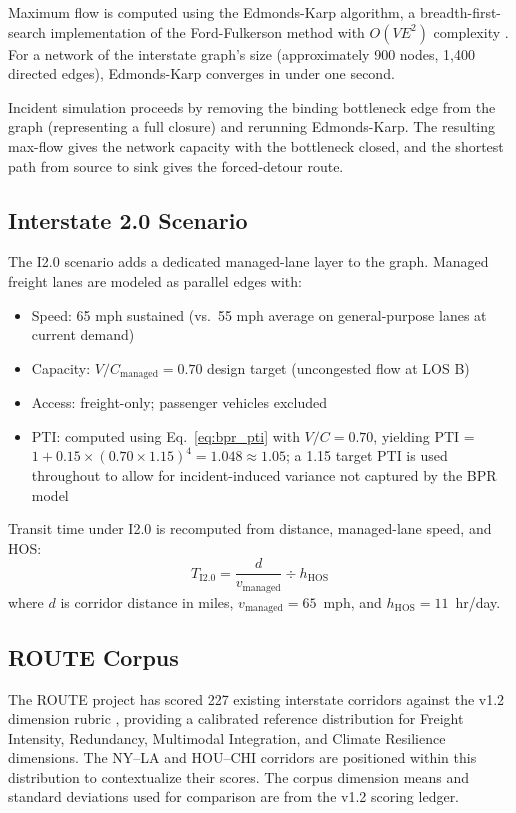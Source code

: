 Maximum flow is computed using the Edmonds-Karp algorithm, a breadth-first-search implementation of the Ford-Fulkerson method with $O(VE^2)$ complexity \citep{ROUTE_A1}. For a network of the interstate graph's size (approximately 900 nodes, 1,400 directed edges), Edmonds-Karp converges in under one second.

Incident simulation proceeds by removing the binding bottleneck edge from the graph (representing a full closure) and rerunning Edmonds-Karp. The resulting max-flow gives the network capacity with the bottleneck closed, and the shortest path from source to sink gives the forced-detour route.

\subsection{Interstate 2.0 Scenario}

The I2.0 scenario adds a dedicated managed-lane layer to the graph. Managed freight lanes are modeled as parallel edges with:
\begin{itemize}
  \item Speed: 65 mph sustained (vs.\ 55 mph average on general-purpose lanes at current demand)
  \item Capacity: $V/C_{\text{managed}} = 0.70$ design target (uncongested flow at LOS B)
  \item Access: freight-only; passenger vehicles excluded
  \item PTI: computed using Eq.~\ref{eq:bpr_pti} with $V/C = 0.70$, yielding PTI = $1 + 0.15 \times (0.70 \times 1.15)^4 = 1.048 \approx 1.05$; a 1.15 target PTI is used throughout to allow for incident-induced variance not captured by the BPR model
\end{itemize}

Transit time under I2.0 is recomputed from distance, managed-lane speed, and HOS:
\begin{equation}
  T_{\text{I2.0}} = \frac{d}{v_{\text{managed}}} \div h_{\text{HOS}}
  \label{eq:transit_i20}
\end{equation}
where $d$ is corridor distance in miles, $v_{\text{managed}} = 65$~mph, and $h_{\text{HOS}} = 11$~hr/day.

\subsection{ROUTE Corpus}

The ROUTE project has scored 227 existing interstate corridors against the v1.2 dimension rubric \citep{ROUTE_A2}, providing a calibrated reference distribution for Freight Intensity, Redundancy, Multimodal Integration, and Climate Resilience dimensions. The NY--LA and HOU--CHI corridors are positioned within this distribution to contextualize their scores. The corpus dimension means and standard deviations used for comparison are from the v1.2 scoring ledger.

